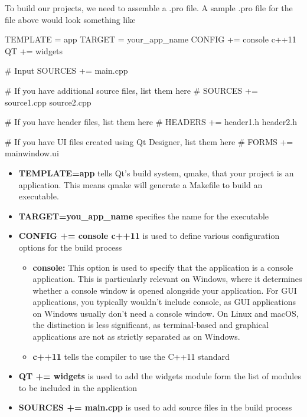 \documentclass{report}
\begin{document}
    \pagebreak
    \bigbreak \noindent 
    To build our projects, we need to assemble a .pro file. A sample .pro file for the file above would look something like
    \bigbreak \noindent 
    \begin{cppcode}
TEMPLATE = app
TARGET = your_app_name
CONFIG += console c++11
QT += widgets

# Input
SOURCES += main.cpp

# If you have additional source files, list them here
# SOURCES += source1.cpp source2.cpp

# If you have header files, list them here
# HEADERS += header1.h header2.h

# If you have UI files created using Qt Designer, list them here
# FORMS += mainwindow.ui
    \end{cppcode}
    \begin{itemize}
        \item \textbf{TEMPLATE=app} tells Qt's build system, qmake, that your project is an application. This means qmake will generate a Makefile to build an executable.
        \item \textbf{TARGET=you\_app\_name} specifies the name for the executable
        \item \textbf{CONFIG += console c++11} is used to define various configuration options for the build process
            \begin{itemize}
                \item \textbf{console:} This option is used to specify that the application is a console application. This is particularly relevant on Windows, where it determines whether a console window is opened alongside your application. For GUI applications, you typically wouldn't include console, as GUI applications on Windows usually don't need a console window. On Linux and macOS, the distinction is less significant, as terminal-based and graphical applications are not as strictly separated as on Windows.
                \item \textbf{c++11} tells the compiler to use the C++11 standard
            \end{itemize}
        \item \textbf{QT += widgets} is used to add the widgets module form the list of modules to be included in the application 
        \item \textbf{SOURCES += main.cpp} is used to add source files in the build process
    \end{itemize}
\end{document}
